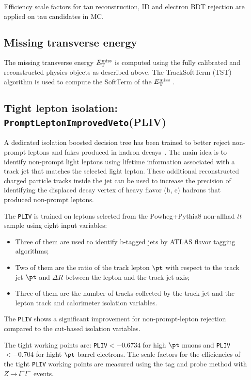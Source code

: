 Efficiency scale factors for tau reconstruction, ID and electron BDT rejection \cite{TauCP} are applied on tau candidates in MC.

\subsection{Missing transverse energy}
The missing transverse energy $E_{\text{T}}^{\text{miss}}$ is computed using the fully calibrated and reconstructed physics objects as described above. The TrackSoftTerm (TST) algorithm is used to compute the SoftTerm of the $E_{\text{T}}^{\text{miss}}$ \cite{MET}. 

\subsection{Tight lepton isolation: \texttt{PromptLeptonImprovedVeto}(PLIV)}
\label{sec:Pliv}
A dedicated isolation boosted decision tree has been trained to better reject non-prompt leptons and fakes produced in hadron decays~\cite{ATL-COM-PHYS-2018-410}. The main idea is to identify non-prompt light leptons using lifetime information associated with a track jet that matches the selected light lepton. These additional reconstructed charged particle tracks inside the jet can be used to increase the precision of identifying the displaced decay vertex of heavy flavor (b, c) hadrons that produced non-prompt leptons.

The \texttt{PLIV} is trained on leptons selected from the Powheg+Pythia8 non-allhad $t\bar t$ sample using eight input variables:
\begin{itemize}
\item Three of them are used to identify b-tagged jets by ATLAS flavor tagging algorithms;
\item Two of them are the ratio of the track lepton $\pt$ with respect to the track jet $\pt$ and $\Delta R$ between the lepton and the track jet axis;
\item Three of them are the number of tracks collected by the track jet and the lepton track and calorimeter isolation variables. 
\end{itemize}

The \texttt{PLIV} shows a significant improvement for non-prompt-lepton rejection compared to the cut-based isolation variables.

The tight working points are: \texttt{PLIV}$<-0.6734$ for high $\pt$ muons and \texttt{PLIV}$<-0.704$ for hight $\pt$ barrel electrons. The scale factors for the efficiencies of the tight \texttt{PLIV} working points are measured using the tag and probe method with $Z\rightarrow l^+l^-$ events.

